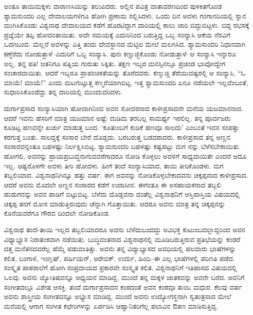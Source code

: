 ಅಂತೂ ತಾಯಿಮಕ್ಕಳು ವಾರಾಣಸಿಯನ್ನು ತಲುಪಿದರು. ಅಲ್ಲಿನ ಪವಿತ್ರ ವಾತಾವರಣದಿಂದ ಪುಳಕಿತಗೊಂಡ ಶ್ಯಾಮಸುಂದರಿ ಎಲ್ಲ ದೇವಾಲಯಗಳಿಗೂ ಹೋಗಿ ಪ್ರಣಾಮ ಸಲ್ಲಿಸಿದಳು. ಒಂದು ದಿನ ಅವಳು ಗಂಗಾನದಿಯಲ್ಲಿ ಸ್ನಾನ ಮುಗಿಸಿಕೊಂಡು ವಿಶ್ವನಾಥ ದೇವಾಲಯದ ಕಡೆಗೆ ಹೊರಟಿದ್ದಾಗ ದಾರಿಯಲ್ಲಿ ಕಾಲು ಜಾರಿ ಬಿದ್ದುಬಿಟ್ಟಳು. ಬಿದ್ದ ರಭಸಕ್ಕೆ ಪ್ರಜ್ಞೆಯೇ ತಪ್ಪಿ ಹೋದಂತಾಯಿತು. ಅದೇ ಸಮಯಕ್ಕೆ ಎದುರಿನಿಂದ ಬರುತ್ತಿದ್ದ ಒಬ್ಬ ಸಂನ್ಯಾಸಿ ಆಕೆಯ ನೆರವಿಗೆ ಒದಗಿಬಂದ. ಮೆಲ್ಲನೆ ಅವಳನ್ನು ಎತ್ತಿ ತಂದು ದೇವಸ್ಥಾನದ ಮೆಟ್ಟಿಲ ಮೇಲೆ ಮಲಗಿಸಿದ. ಶ್ಯಾಮಸುಂದರಿ ನಿಧಾನವಾಗಿ ಕಣ್ತೆರೆದು ನೋಡುತ್ತಾಳೆ–ಎದುರಿಗೆ ಒಬ್ಬ ಸಂನ್ಯಾಸಿ. ಪುನಃ ಕಣ್ಣುಜ್ಜಿಕೊಂಡು ನೋಡುತ್ತಾಳೆ–ಆ ಸಂನ್ಯಾಸಿ ಇನ್ನಾರೂ ಅಲ್ಲ, ತನ್ನ ಪತಿ! ಆತನಿಗೂ ಪತ್ನಿಯ ಗುರುತು ಸಿಕ್ಕಿತು. ತಕ್ಷಣ ಇಬ್ಬರ ಮನಸ್ಸಿನಲ್ಲೂ ಪ್ರಚಂಡ ಭಾವೋದ್ವೇಗ ಸಂಚಾರವಾಯಿತು. ಆದರೆ ಇಬ್ಬರೂ ಪ್ರಾಪಂಚಿಕತೆಯನ್ನು ತೊರೆದವರು. ಕಣ್ಮುಚ್ಚಿ ತೆರೆಯುವಷ್ಟರಲ್ಲಿ ಆ ಸಂನ್ಯಾಸಿ, “ಓ ಮಾಯೆ! ಮಾಯೆ!” ಎಂದು ಮಟಗುಟ್ಟುತ್ತ ಕಣ್ಮರೆಯಾಗಿಬಿಟ್ಟ. ಇತ್ತ ಶ್ಯಾಮಸುಂದರಿ ಏನೂ ನಡೆಯಲೇ ಇಲ್ಲವೆಂಬಂತೆ, ಸುಧಾರಿಸಿಕೊಂಡೆದ್ದು ತನ್ನ ದಾರಿಯಲ್ಲಿ ಮುಂದುವರಿದಳು.

ದುರ್ಗಾಪ್ರಸಾದ ಸಂನ್ಯಾಸಿಯಾಗಿ ಹೋದಾಗಿನಿಂದ ಅವನ ಸೋದರನಾದ ಕಾಳೀಪ್ರಸಾದನೇ ಮನೆಯ ಯಜಮಾನನಾದ. ಆದರೆ ಇವನು ಹೆಸರಿಗೆ ಮಾತ್ರ ಯಜಮಾನ ಅಷ್ಟೆ: ದುಡಿದು ತರಬಲ್ಲ ಸಾಮರ್ಥ್ಯ ಇರಲಿಲ್ಲ. ತನ್ನ ಪೂರ್ವಜರು ಕೂಡಿಟ್ಟ ಹಣವನ್ನೇ ಖರ್ಚು ಮಾಡುತ್ತ ಬಂದ. ‘ಕೂತುಂಬಗೆ ಕುಡಿಕೆ ಹಣವೂ ಸಾಲದು’ ಎಂಬಂತೆ ಇವನ ಸಂಪತ್ತು ಕರಗುತ್ತ ಬಂತು. ಸಾಲದ್ದಕ್ಕೆ ಸಂಸಾರ ಬೇರೆ ದೊಡ್ಡದು. ಬರಬರುತ್ತ ಬಡವರಾದರು. ಕಾಳೀಪ್ರಸಾದ ತನ್ನ ಅಣ್ಣನ ಸಂಸಾರವನ್ನಂತೂ ಬಹಳಷ್ಟು ನಿರ್ಲಕ್ಷಿಸಿಬಿಟ್ಟ. ಶ್ಯಾಮಸುಂದರಿ ಬಹಳಷ್ಟು ಕಷ್ಟಪಟ್ಟು ಮಗ ನನ್ನು ಬೆಳೆಸಬೇಕಾಯಿತು. ಹೋಗಲಿ, ಅವನನ್ನು ಪ್ರಾಯಪ್ರಬುದ್ಧನಾಗುವವರೆಗಾದರೂ ನೋಡಿ ಕೊಳ್ಳಲು ಅವಳಿಗೆ ಸಾಧ್ಯವಾಯಿತೇ ಎಂದರೆ ಅದೂ ಇಲ್ಲ. ಅಷ್ಟರೊಳಗೇ ಅವಳು ತೀರಿ ಹೋದಳು. ಹೀಗೆ ತಂದೆ ಸಂನ್ಯಾಸಿಯಾದ, ತಾಯಿ ತೀರಿಕೊಂಡಳು. ಮಗ ತಬ್ಬಲಿಯಾದ. ವಿಶ್ವನಾಥನಿಗಿನ್ನೂ ಹತ್ತು ವರ್ಷ. ಈಗ ಅವನನ್ನು ನೋಡಿಕೊಳ್ಳಬೇಕಾದವನು ಚಿಕ್ಕಪ್ಪನಾದ ಕಾಳೀಪ್ರಸಾದ. ಆದರೆ ಅವನು ಮೊದಲೇ ಅಣ್ಣನ ಸಂಸಾರದ ಕಡೆಗೆ ಉದಾಸೀನ. ಈಗಂತೂ ಈ ಅಸಹಾಯಕನಾದ ತಬ್ಬಲಿ ಹುಡುಗನನ್ನು ಅವನ ಪಾಡಿಗೆ ಬಿಟ್ಟುಬಿಟ್ಟ. ಬೆಳೆದು ದೊಡ್ಡವನಾ ದಂತೆಲ್ಲ ವಿಶ್ವನಾಥನಿಗೆ ಆಸ್ತಿಪಾಸ್ತಿಯ ವಿಷಯದಲ್ಲಿ ಚಿಕ್ಕಪ್ಪ ತನಗೆ ಮೋಸ ಮಾಡುತ್ತಿರುವುದು ಚೆನ್ನಾಗಿ ಗೊತ್ತಾಯಿತು. ಆದರೂ ಅವನು ಮಾತ್ರ ತನ್ನ ಚಿಕ್ಕಪ್ಪನನ್ನು ಕೊನೆಯವರೆಗೂ ಗೌರವ ದಿಂದಲೇ ನೋಡಿಕೊಂಡ.

ವಿಶ್ವನಾಥ ತಂದೆ-ತಾಯಿ ಇಲ್ಲದ ತಬ್ಬಲಿಯಾದರೂ ಅವನು ಬೆಳೆದುಬಂದದ್ದು ಅವಿಭಕ್ತ ಕುಟುಂಬದಲ್ಲಾದ್ದರಿಂದ ಅವನ ವಿಧ್ಯಾಭ್ಯಾಸ ನಿರಾತಂಕವಾಗಿ ನಡೆಯಿತು. ಬುದ್ಧಿವಂತನಾದ ವಿಶ್ವನಾಥನಲ್ಲಿ ಮೂಡಿಬರುತ್ತಿರುವ ಪ್ರತಿಭೆಯನ್ನು ಕಂಡರೆ ದತ್ತ ಮನೆತನದವರೆಲ್ಲ ಹೆಮ್ಮೆ ಪಡುವಂತಿತ್ತು. ಅವನು ತನ್ನ ವಿದ್ಯಾಭ್ಯಾಸದ ಅವಧಿಯಲ್ಲಿ ಹಲವಾರು ಭಾಷೆಗಳನ್ನು ಕಲಿತ, ಬಂಗಾಳಿ, ಇಂಗ್ಲಿಷ್, ಪರ್ಷಿಯನ್, ಅರೇಬಿಕ್, ಉರ್ದು, ಹಿಂದಿ–ಈ ಎಲ್ಲ ಭಾಷೆಗಳಲ್ಲಿ ಪರಿಣತಿ ಪಡೆದ. ಸಂಸ್ಕೃತ ಪಾಠಶಾಲೆಗೆ ಹೋಗಿ ಸಂಪ್ರದಾಯದ ಪ್ರಕಾರವೇ ಸಂಸ್ಕೃತ ಕಲಿತ. ವಿಶ್ವನಾಥನಿಗೆ ಇತಿಹಾಸದ ವಿಷಯದಲ್ಲಿ ಒಲವು. ಅವನು ಜ್ಯೋತಿಷವನ್ನೂ ಅಧ್ಯಯನ ಮಾಡಿದ್ದ. ಮುಂದೆ ತನ್ನ ಮಕ್ಕಳ ಜಾತಕವನ್ನು ಅವನೇ ಬರೆದ. ಅವನಿಗೆ ಸಂಗೀತದಲ್ಲೂ ವಿಶೇಷ ಆಸಕ್ತಿ. ತಂದೆ ದುರ್ಗಾಪ್ರಸಾದನ ಕಂಠದಂತೆ ಅವನ ಕಂಠವೂ ತುಂಬ ಮಧುರ. ಕೆಲವು ವರ್ಷ ಅವನು ಶಾಸ್ತ್ರೀಯ ಸಂಗೀತವನ್ನೂ ಅಭ್ಯಾಸ ಮಾಡಿದ್ದ. ಮುಂದೆ ಅವನು ಉದ್ಯೋಗಸ್ಥನಾಗಿ ಸ್ವತಂತ್ರನಾದ ಮೇಲೆ ಮನೆಯಲ್ಲಿ ಆಗಾಗ ಸಂಗೀತ ಕಛೇರಿಗಳನ್ನು ಏರ್ಪಡಿಸಿ ಆಹ್ವಾನಿತರಿಗೆಲ್ಲ ಪಲಾವಿನ ಔತಣ ಮಾಡಿಸುತ್ತಿದ್ದ.

